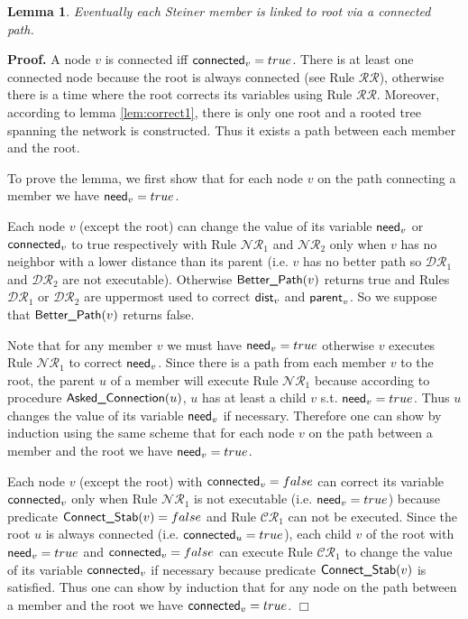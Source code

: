 \documentclass[11pt]{article}
\newtheorem{lemma}{Lemma}
\newenvironment{proof}{\noindent \begin{rm}{\textbf{Proof.} }}{\hspace*{\fill}$\Box$\par\end{rm} \vspace{.3cm}}
\newcommand{\parent}{\mbox{\sf parent}}
\newcommand{\dist}{\mbox{\sf dist}}
\newcommand{\need}{\mbox{\sf need}}
\newcommand{\connect}{\mbox{\sf connected}}
\newcommand{\Better}{\mbox{\sf Better\_Path}}
\newcommand{\Ask}{\mbox{\sf Asked\_Connection}}
\newcommand{\ConnectS}{\mbox{\sf Connect\_Stab}}
\newcommand{\ARA}{$\mathcal{DR}_1$}
\newcommand{\ARB}{$\mathcal{DR}_2$}
\newcommand{\CRA}{$\mathcal{RR}$}
\newcommand{\CRB}{$\mathcal{NR}_1$}
\newcommand{\CRC}{$\mathcal{NR}_2$}
\newcommand{\CRD}{$\mathcal{CR}_1$}
\begin{document}
\begin{lemma}
\label{lem:correct2}
Eventually each Steiner member is linked to root via a connected path.
\end{lemma}

\begin{proof}
A node $v$ is connected iff $\connect_v=true$. There is at least one
connected node because the root is always connected (see Rule \CRA\/),
otherwise there is a time where the root corrects its variables using
Rule \CRA\/. Moreover, according to lemma \ref{lem:correct1}, there is
only one root and a rooted tree spanning the network is
constructed. Thus it exists a path between each member and the root.

To prove the lemma, we first show that for each node $v$ on the path
connecting a member we have $\need_v=true$.

Each node $v$ (except the root) can change the value of its variable
$\need_v$ or $\connect_v$ to true respectively with Rule \CRB\/ and \CRC\/
only when $v$ has no neighbor with a lower distance than its parent
(i.e. $v$ has no better path so \ARA\/ and \ARB\/ are not
executable). Otherwise $\Better(v)$ returns true and Rules \ARA\/ or
\ARB\/ are uppermost used to correct $\dist_v$ and $\parent_v$. So we
suppose that $\Better(v)$ returns false.

Note that for any member $v$ we must have $\need_v=true$ otherwise $v$
executes Rule \CRB\/ to correct $\need_v$. Since there is a path from each
member $v$ to the root, the parent $u$ of a member will execute Rule
\CRB\/ because according to procedure $\Ask(u)$, $u$ has at
least a child $v$ s.t. $\need_v=true$. Thus $u$ changes the value of
its variable $\need_v$ if necessary. Therefore one can show by
induction using the same scheme that for each node $v$ on the path
between a member and the root we have $\need_v=true$.

Each node $v$ (except the root) with $\connect_v=false$ can correct
its variable $\connect_v$ only when Rule \CRB\/ is not executable
(i.e. $\need_v=true$) because predicate $\ConnectS(v)=false$ and
Rule \CRD\/ can not be executed. Since the root $u$ is always connected
(i.e. $\connect_u=true$), each child $v$ of the root with
$\need_v=true$ and $\connect_v=false$ can execute Rule \CRD\/ to change
the value of its variable $\connect_v$ if necessary because predicate
$\ConnectS(v)$ is satisfied. Thus one can show by induction that
for any node on the path between a member and the root we have
$\connect_v=true$.
\end{proof}
\end{document}
